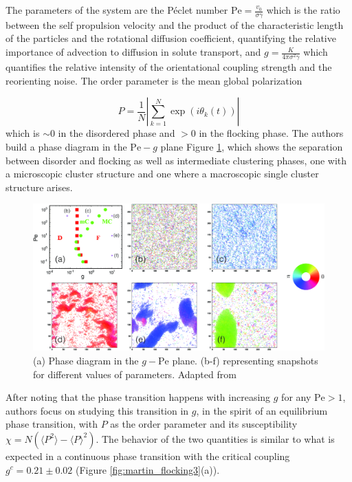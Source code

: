 \documentclass[../../master_thesis_np.tex]{subfiles}
\begin{document}
	The parameters of the system are the Péclet number $\mathrm{Pe} = \frac{v_0}{\sigma \gamma}$ which is the ratio between the self propulsion velocity and the product of the characteristic length of the particles and the rotational diffusion coefficient, quantifying the relative importance of advection to diffusion in solute transport, and $g = \frac{K}{4\pi \sigma^2 \gamma}$ which quantifies the relative intensity of the orientational coupling strength and the reorienting noise. 
	The order parameter is the mean global polarization

   	 \begin{equation} 
   	 P = \frac{1}{N}\left| \sum_{k=1}^{N} \exp(i \theta_k(t)) \right|
   	 \end{equation}
  	 which is $\sim 0$ in the disordered phase and $> 0$ in the flocking phase. 
	 The authors build a phase diagram in the $\mathrm{Pe}-g$ plane Figure \ref{fig:martin_flocking1}, which shows the separation between disorder and flocking as well as intermediate clustering phases, one with a microscopic cluster structure and one where a macroscopic single cluster structure arises.
	
	\begin{figure}[h]
		\centering
		\includegraphics[width=\singfigwidth]{martin_phaseseparation.png}
		\caption{(a) Phase diagram in the $g-\text{Pe}$ plane. (b-f) representing snapshots for different values of parameters. Adapted from \cite{martin-gomez_collective_2018}}
		\label{fig:martin_flocking1}
	\end{figure}
	
	After noting that the phase transition happens with increasing $g$ for any $\mathrm{Pe} > 1$, authors focus on studying this transition in $g$, in the  spirit of an equilibrium phase transition, with $P$ as the order parameter and its susceptibility $\chi = N(\langle P^2 \rangle - \langle P \rangle^2)$. 
	The behavior of the two quantities is similar to what is expected in a continuous phase transition with the critical coupling $g^c = 0.21 \pm 0.02$ (Figure \ref{fig:martin_flocking3}(a)).
	
\end{document}
